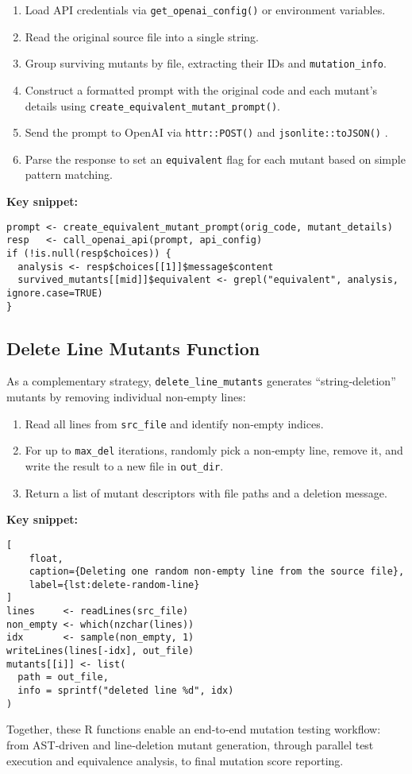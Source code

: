 \begin{enumerate}
  \item Load API credentials via \texttt{get\_openai\_config()} or environment variables.  
  \item Read the original source file into a single string.  
  \item Group surviving mutants by file, extracting their IDs and \texttt{mutation\_info}.  
  \item Construct a formatted prompt with the original code and each mutant’s details using \texttt{create\_equivalent\_mutant\_prompt()}.  
  \item Send the prompt to OpenAI via \texttt{httr::POST()} and \texttt{jsonlite::toJSON()} \cite{wickham2011httr,ooms2014jsonlite,openai2023api}.  
  \item Parse the response to set an \texttt{equivalent} flag for each mutant based on simple pattern matching.
\end{enumerate}

\medskip
\noindent\textbf{Key snippet:}
\begin{verbatim}
prompt <- create_equivalent_mutant_prompt(orig_code, mutant_details)
resp   <- call_openai_api(prompt, api_config)
if (!is.null(resp$choices)) {
  analysis <- resp$choices[[1]]$message$content
  survived_mutants[[mid]]$equivalent <- grepl("equivalent", analysis, ignore.case=TRUE)
}
\end{verbatim}

\subsection{Delete Line Mutants Function}

As a complementary strategy, \texttt{delete\_line\_mutants} generates “string‐deletion” mutants by removing individual non‐empty lines:

\begin{enumerate}
  \item Read all lines from \texttt{src\_file} and identify non‐empty indices.  
  \item For up to \texttt{max\_del} iterations, randomly pick a non‐empty line, remove it, and write the result to a new file in \texttt{out\_dir}.  
  \item Return a list of mutant descriptors with file paths and a deletion message.
\end{enumerate}

\medskip
\noindent\textbf{Key snippet:}
\begin{lstlisting}[
    float,
    caption={Deleting one random non‐empty line from the source file},
    label={lst:delete-random-line}
]
lines     <- readLines(src_file)
non_empty <- which(nzchar(lines))
idx       <- sample(non_empty, 1)
writeLines(lines[-idx], out_file)
mutants[[i]] <- list(
  path = out_file,
  info = sprintf("deleted line %d", idx)
)
\end{lstlisting}


Together, these R functions enable an end‐to‐end mutation testing workflow: from AST‐driven and line‐deletion mutant generation, through parallel test execution and equivalence analysis, to final mutation score reporting.
